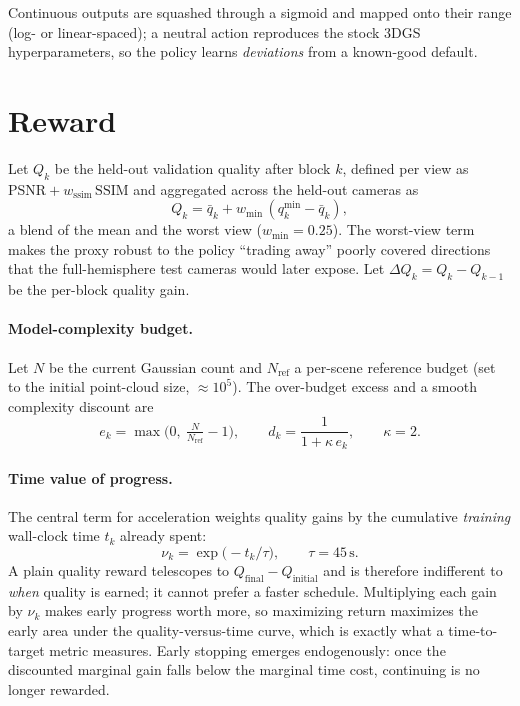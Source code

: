 \documentclass[11pt]{article}
\newcommand{\Nref}{N_{\mathrm{ref}}}
\newcommand{\Ndense}{N}
\begin{document}
Continuous outputs are squashed through a sigmoid and mapped onto their range
(log- or linear-spaced); a neutral action reproduces the stock 3DGS
hyperparameters, so the policy learns \emph{deviations} from a known-good default.

\section{Reward}
\label{sec:reward}

Let $Q_k$ be the held-out validation quality after block $k$, defined per view as
$\mathrm{PSNR} + w_{\mathrm{ssim}}\,\mathrm{SSIM}$ and aggregated across the
held-out cameras as
\begin{equation}
Q_k = \bar{q}_k + w_{\min}\,(q^{\min}_k - \bar{q}_k),
\end{equation}
a blend of the mean and the worst view ($w_{\min}=0.25$). The worst-view term
makes the proxy robust to the policy ``trading away'' poorly covered directions
that the full-hemisphere test cameras would later expose. Let $\Delta Q_k = Q_k -
Q_{k-1}$ be the per-block quality gain.

\paragraph{Model-complexity budget.}
Let $\Ndense$ be the current Gaussian count and $\Nref$ a per-scene reference
budget (set to the initial point-cloud size, $\approx\!10^5$). The over-budget
excess and a smooth complexity discount are
\begin{equation}
e_k = \max\!\Big(0,\ \tfrac{\Ndense}{\Nref}-1\Big), \qquad
d_k = \frac{1}{1 + \kappa\,e_k}, \qquad \kappa = 2.
\end{equation}

\paragraph{Time value of progress.}
The central term for acceleration weights quality gains by the cumulative
\emph{training} wall-clock time $t_k$ already spent:
\begin{equation}
\nu_k = \exp\!\big(-t_k / \tau\big), \qquad \tau = 45\,\text{s}.
\end{equation}
A plain quality reward telescopes to $Q_{\text{final}} - Q_{\text{initial}}$ and
is therefore indifferent to \emph{when} quality is earned; it cannot prefer a
faster schedule. Multiplying each gain by $\nu_k$ makes early progress worth more,
so maximizing return maximizes the early area under the quality-versus-time curve,
which is exactly what a time-to-target metric measures. Early stopping emerges
endogenously: once the discounted marginal gain falls below the marginal time
cost, continuing is no longer rewarded.
\end{document}
